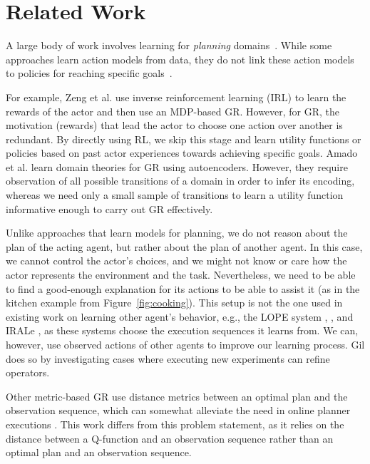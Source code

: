 \documentclass[letterpaper]{article} %
\begin{document}
\section*{Related Work}
\label{sec:related_work}

A large body of work involves learning for \textit{planning} domains~\cite{zimmerman2003learning,arora2018review}.
While some approaches learn action models from data, they do not link these action models to policies for reaching specific goals~\cite{amir2008learning,amado2019latrec,asai2020learning,juba2021safe}.

For example, Zeng et al.  use inverse reinforcement learning (IRL) to learn the rewards of the actor and then use an MDP-based GR.
However, for GR, the motivation (rewards) that lead the actor to choose one action over another is redundant.
By directly using RL, we skip this stage and learn utility functions or policies based on past actor experiences towards achieving specific goals.
Amado et al.  learn domain theories for GR using autoencoders.
However, they require observation of all possible transitions of a domain in order to infer its encoding, whereas we need only a small sample of transitions to learn a utility function informative enough to carry out GR effectively.

Unlike approaches that learn models for planning, we do not reason about the plan of the acting agent, but rather about the plan of another agent.
In this case, we cannot control the actor's choices, and we might not know or care how the actor represents the environment and the task.
Nevertheless, we need to be able to find a good-enough explanation for its actions to be able to assist it (as in the kitchen example from Figure~\ref{fig:cooking}).
This setup is not the one used in existing work on learning other agent's behavior, e.g., the LOPE system \cite{garcia2000integrated}, \cite{safaei2007incremental}, and IRALe \cite{rodrigues2011active}, as these systems choose the execution sequences it learns from.
We can, however, use observed actions of other agents to improve our learning process.
Gil  does so by investigating cases where executing new experiments can refine operators.

Other metric-based GR use distance metrics between an optimal plan and the observation sequence, which can somewhat alleviate the need in online planner executions \cite{masters2017cost,mirsky2019new}. This work differs from this problem statement, as it relies on the distance between a Q-function and an observation sequence rather than an optimal plan and an observation sequence.
%
\end{document}
